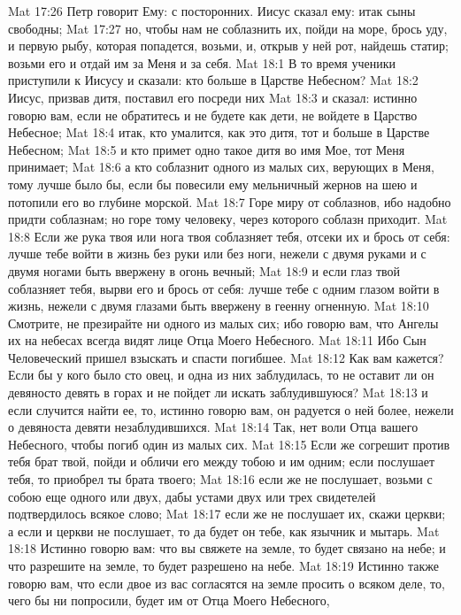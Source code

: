Mat 17:26  Петр говорит Ему: с посторонних. Иисус сказал ему: итак сыны свободны;
Mat 17:27  но, чтобы нам не соблазнить их, пойди на море, брось уду, и первую рыбу, которая попадется, возьми, и, открыв у ней рот, найдешь статир; возьми его и отдай им за Меня и за себя.
Mat 18:1  В то время ученики приступили к Иисусу и сказали: кто больше в Царстве Небесном?
Mat 18:2  Иисус, призвав дитя, поставил его посреди них
Mat 18:3  и сказал: истинно говорю вам, если не обратитесь и не будете как дети, не войдете в Царство Небесное;
Mat 18:4  итак, кто умалится, как это дитя, тот и больше в Царстве Небесном;
Mat 18:5  и кто примет одно такое дитя во имя Мое, тот Меня принимает;
Mat 18:6  а кто соблазнит одного из малых сих, верующих в Меня, тому лучше было бы, если бы повесили ему мельничный жернов на шею и потопили его во глубине морской.
Mat 18:7  Горе миру от соблазнов, ибо надобно придти соблазнам; но горе тому человеку, через которого соблазн приходит.
Mat 18:8  Если же рука твоя или нога твоя соблазняет тебя, отсеки их и брось от себя: лучше тебе войти в жизнь без руки или без ноги, нежели с двумя руками и с двумя ногами быть ввержену в огонь вечный;
Mat 18:9  и если глаз твой соблазняет тебя, вырви его и брось от себя: лучше тебе с одним глазом войти в жизнь, нежели с двумя глазами быть ввержену в геенну огненную.
Mat 18:10  Смотрите, не презирайте ни одного из малых сих; ибо говорю вам, что Ангелы их на небесах всегда видят лице Отца Моего Небесного.
Mat 18:11  Ибо Сын Человеческий пришел взыскать и спасти погибшее.
Mat 18:12  Как вам кажется? Если бы у кого было сто овец, и одна из них заблудилась, то не оставит ли он девяносто девять в горах и не пойдет ли искать заблудившуюся?
Mat 18:13  и если случится найти ее, то, истинно говорю вам, он радуется о ней более, нежели о девяноста девяти незаблудившихся.
Mat 18:14  Так, нет воли Отца вашего Небесного, чтобы погиб один из малых сих.
Mat 18:15  Если же согрешит против тебя брат твой, пойди и обличи его между тобою и им одним; если послушает тебя, то приобрел ты брата твоего;
Mat 18:16  если же не послушает, возьми с собою еще одного или двух, дабы устами двух или трех свидетелей подтвердилось всякое слово;
Mat 18:17  если же не послушает их, скажи церкви; а если и церкви не послушает, то да будет он тебе, как язычник и мытарь.
Mat 18:18  Истинно говорю вам: что вы свяжете на земле, то будет связано на небе; и что разрешите на земле, то будет разрешено на небе.
Mat 18:19  Истинно также говорю вам, что если двое из вас согласятся на земле просить о всяком деле, то, чего бы ни попросили, будет им от Отца Моего Небесного,
